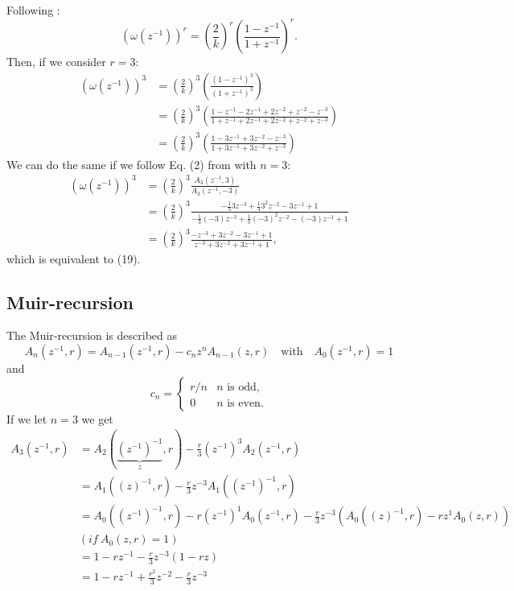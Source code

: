 \documentclass[dvipsnames]{article}
\def\z{z^{-1}}
\begin{document}
Following \cite{Chen2002}:
\begin{equation}
    (\omega(\z))^r = \left(\frac{2}{k}\right)^r \left(\frac{1-\z}{1+\z}\right)^r.
\end{equation}
Then, if we consider $r = 3$:
\begin{equation}
    \begin{aligned}
    (\omega(\z))^3 &= \left(\frac{2}{k}\right)^3\left(\frac{(1-\z)^3}{(1+\z)^3}\right)\\
    &= \left(\frac{2}{k}\right)^3\left(\frac{1-\z-2\z+2z^{-2}+z^{-2}-z^{-3}}{1+\z+2\z+2z^{-2}+z^{-2}+z^{-3}}\right)\\
    &= \left(\frac{2}{k}\right)^3\left(\frac{1-3\z+3z^{-2}-z^{-3}}{1+3\z+3z^{-2}+z^{-3}}\right)
    \end{aligned}
\end{equation}
We can do the same if we follow Eq. (2) from \cite{Chen2002} with $n=3$:
\begin{equation}
    \begin{aligned}
    (\omega(\z))^3 &= \left(\frac{2}{k}\right)^3\frac{A_3(\z,3)}{A_3(\z,-3)}\\
    &= \left(\frac{2}{k}\right)^3\frac{-\frac{1}{3}3z^{-3}+\frac{1}{3}3^2z^{-2}-3\z+1}{-\frac{1}{3}(-3)z^{-3}+\frac{1}{3}(-3)^2z^{-2}-(-3)\z+1}\\
    &=\left(\frac{2}{k}\right)^3\frac{-z^{-3}+3z^{-2}-3\z+1}{z^{-3}+3z^{-2}+3\z+1},
    \end{aligned}
\end{equation}
which is equivalent to (19).

\subsection{Muir-recursion}
The Muir-recursion is described as
\begin{equation}\label{eq:muir}
    A_n(\z,r) = A_{n-1}(\z,r) -c_nz^nA_{n-1}(z,r) \quad \text{with} \quad A_0(z^{-1},r) = 1
\end{equation}
and
\begin{equation}
    c_n=
    \begin{cases}
    r/n & n \text{ is odd},\\
    0 & n \text{ is even.}
    \end{cases}
\end{equation}
If we let $n=3$ we get
\begin{equation}
    \begin{aligned}
        A_3(\z,r)&= A_2(\underbrace{(\z)^{-1}}_{z},r) - \frac{r}{3}(\z)^3A_2(\z,r)\\
        &= A_1((z)^{-1},r) - \frac{r}{3}z^{-3}A_1((\z)^{-1},r)\\
        &= A_0((\z)^{-1},r) - r(\z)^1A_0(\z,r)-\frac{r}{3}z^{-3}\left(A_0((z)^{-1},r)-rz^1A_0(z,r)\right)\\
        &(if\ A_0(z,r) = 1)\\
        &=1-r\z-\frac{r}{3}z^{-3}\left(1-rz\right)\\
        &=1-r\z+\frac{r^2}{3}z^{-2}-\frac{r}{3}z^{-3}
    \end{aligned}
\end{equation}
\end{document}
